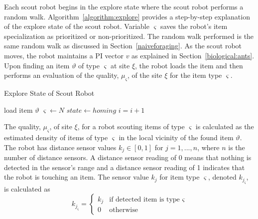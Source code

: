 Each scout robot begins in the explore state where the scout robot performs a random walk. Algorithm~\ref{algorithm:explore} provides a step-by-step explanation of the explore state of the scout robot. Variable $\varsigma$ saves the robot's item specialization as prioritized or non-prioritized. The random walk performed is the same random walk as discussed in Section~\ref{naiveforaging}. As the scout robot moves, the robot maintains a PI vector $v$ as explained in Section~\ref{biological:ants}. Upon finding an item $\vartheta$ of type $\varsigma$ at site $\xi$, the robot loads the item and then performs an evaluation of the quality, $\mu_\varsigma$, of the site $\xi$ for the item type $\varsigma$. 


\begin{algorithm}
\caption{Explore State of Scout Robot}
\label{algorithm:explore}
\begin{algorithmic}[1]
\State {}
\State {}

 	\State {}
	\State load item $\vartheta$
	\State $\varsigma \gets N$
	\State $state \gets homing$
\EndIf
\State $i = i + 1$
\EndFunction
\end{algorithmic}
\end{algorithm}

The quality, $\mu_\varsigma$, of site $\xi$, for a robot scouting items of type $\varsigma$ is calculated as the estimated density of items of type $\varsigma$ in the local vicinity of the found item $\vartheta$. The robot has distance sensor values $k_j\in[0,1]$ for $j = 1,...,n$, where $n$ is the number of distance sensors. A distance sensor reading of 0 means that nothing is detected in the sensor's range and a distance sensor reading of 1 indicates that the robot is touching an item. The sensor value $k_j$ for item type $\varsigma$, denoted $k_{j_\varsigma}$, is calculated as 
\begin{equation}
\label{densitytype}
k_{j_\varsigma}=
    \begin{cases}
      k_j & \text{if detected item is type $\varsigma$} \\
      0 & \text{otherwise}
    \end{cases}
\end{equation}

